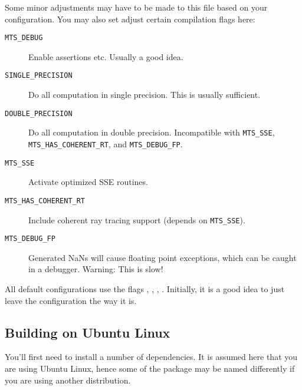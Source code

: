 Some minor adjustments may have to be made to this file based on your configuration. 
You may also set adjust certain compilation flags here:
\begin{description}
\item[\texttt{MTS\_DEBUG}] Enable assertions etc. Usually a good idea.
\item[\texttt{SINGLE\_PRECISION}] Do all computation in single precision. This is usually sufficient.
\item[\texttt{DOUBLE\_PRECISION}] Do all computation in double precision. Incompatible with
\texttt{MTS\_SSE}, \texttt{MTS\_HAS\_COHERENT\_RT}, and \texttt{MTS\_DEBUG\_FP}.
\item[\texttt{MTS\_SSE}]Activate optimized SSE routines.
\item[\texttt{MTS\_HAS\_COHERENT\_RT}]Include coherent ray tracing support (depends on \texttt{MTS\_SSE}).
\item[\texttt{MTS\_DEBUG\_FP}]Generated NaNs will cause floating point exceptions, which can be caught in a debugger. Warning: This is slow!
\end{description}
All default configurations use the flags , , , .
Initially, it is a good idea to just leave the configuration the way it is.

\subsection{Building on Ubuntu Linux}
You'll first need to install a number of dependencies. It is assumed here
that you are using Ubuntu Linux, hence some of the package may be named differently if you are 
using another distribution.

